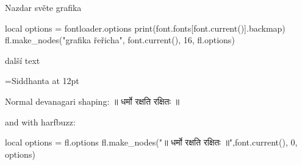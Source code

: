 \documentclass{article}
\begin{document}
\ahoj Nazdar světe grafika
\begin{luacode*}
  local options = fontloader.options
  print(font.fonts[font.current()].backmap)
  fl.make_nodes("grafika řeřicha", font.current(), 16, fl.options)
\end{luacode*}

další text

\font\siddhanta={Siddhanta} at 12pt
\bigskip

\siddhanta 

Normal devanagari shaping: ॥ धर्मो रक्षति रक्षितः ॥

and with harfbuzz: 
\begin{luacode*}
  local options = fl.options
fl.make_nodes("॥ धर्मो रक्षति रक्षितः ॥",font.current(), 0, options)
\end{luacode*}
\end{document}

